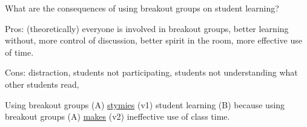 \documentclass[12pt]{article}
\begin{document}
What are the consequences of using breakout groups on student learning?

Pros: (theoretically) everyone is involved in breakout groups, better learning without, more control of discussion, better spirit in the room, more effective use of time.

Cons: distraction, students not participating, students not understanding what other students read, 

Using breakout groups (A) \uline{stymies} (v1) student learning (B) because using breakout groups (A) \uline{makes} (v2) ineffective use of class time.

\end{document}

